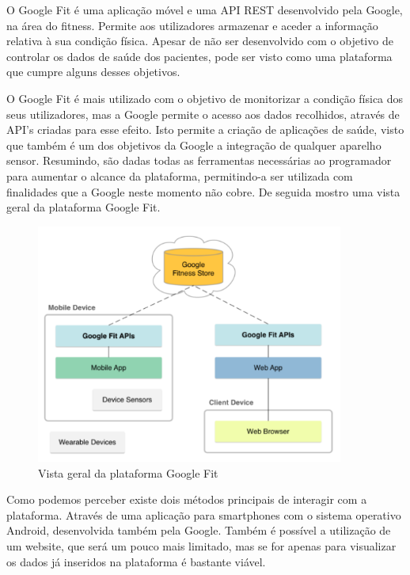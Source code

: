 O Google Fit é uma aplicação móvel e uma \gls{API} \gls{REST} desenvolvido pela Google, na área do fitness. Permite aos utilizadores armazenar e aceder a informação relativa à sua condição física. Apesar de não ser desenvolvido com o objetivo de controlar os dados de saúde dos pacientes, pode ser visto como uma plataforma que cumpre alguns desses objetivos.
\par 
O Google Fit é mais utilizado com o objetivo de monitorizar a condição física dos seus utilizadores, mas a Google permite o acesso aos dados recolhidos, através de \gls{API}’s criadas para esse efeito. Isto permite a criação de aplicações de saúde, visto que também é um dos objetivos da Google a integração de qualquer aparelho sensor. Resumindo, são dadas todas as ferramentas necessárias ao programador para aumentar o alcance da plataforma, permitindo-a ser utilizada com finalidades que a Google neste momento não cobre. 
De seguida mostro uma vista geral da plataforma Google Fit.

\begin{figure}[!ht]
  \centering
  \includegraphics[width=0.9\textwidth]{imgs/googleFitOverview.PNG}
  \caption[Vista geral da plataforma Google Fit]{Vista geral da plataforma Google Fit \cite{googlefit}}
  
  \label{f:googleFitOverview}
\end{figure}

Como podemos perceber existe dois métodos principais de interagir com a plataforma. Através de uma aplicação para smartphones com o sistema operativo Android, desenvolvida também pela Google.  Também é possível a utilização de um website, que será um pouco mais limitado, mas se for apenas para visualizar os dados já inseridos na plataforma é bastante viável.

